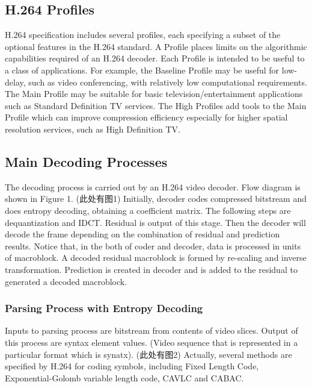 \documentclass[../main.tex]{subfiles}
\begin{document}
\subsection{ H.264 Profiles}

H.264 specification includes several profiles, each specifying a subset of the optional features in the H.264 standard. A Profile places limits on the algorithmic capabilities
required of an H.264 decoder. Each Profile is intended to be useful to a class of
applications. For example, the Baseline Profile may be useful for low-delay, such as video conferencing, with relatively low computational requirements. The
Main Profile may be suitable for basic television/entertainment applications such as Standard
Definition TV services. The High Profiles add tools to the Main Profile which can improve compression efficiency especially for higher spatial resolution services, such as High Definition TV.



\subsection{ Main Decoding Processes }

The decoding process is carried out by an H.264 video decoder. Flow diagram is shown in Figure 1. (此处有图1) Initially, decoder codes compressed bitstream and does entropy decoding, obtaining a coefficient matrix. The following steps are dequantization and IDCT. Residual is output of this stage. Then the decoder will decode the frame depending on the combination of residual and prediction results. Notice that, in the both of coder and decoder, data is processed in units of macroblock. A decoded residual macroblock is formed by re-scaling and inverse transformation. Prediction is created in decoder and is added to the residual to generated a decoded macroblock. 

\subsubsection{ Parsing Process with Entropy Decoding }

Inputs to parsing process are bitstream from contents of video slices. Output of this process are syntax element values. (Video sequence that is represented in a particular format which is synatx). (此处有图2) Actually, several methods are specified by H.264 for coding symbols, including Fixed Length Code, Exponential-Golomb variable length code, CAVLC and CABAC. 
\end{document}
